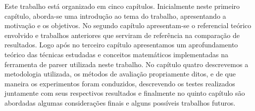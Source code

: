 Este trabalho está organizado em cinco capítulos. Inicialmente neste primeiro capítulo, aborda-se uma introdução ao tema do trabalho, apresentando a motivação e os objetivos. No segundo capítulo apresentam-se o referencial teórico envolvido e trabalhos anteriores que serviram de referência na comparação de resultados. Logo após no terceiro capítulo apresentamos um aprofundamento teórico das técnicas estudadas e conceitos matemáticos implementadas na ferramenta de parser utilizada neste trabalho. No capítulo quatro descrevemos a metodologia utilizada, os métodos de avaliação propriamente ditos, e de que maneira os experimentos foram conduzidos, descrevendo os testes realizados juntamente com seus respectivos resultados e finalmente no quinto capítulo são abordadas algumas considerações finais e alguns possíveis trabalhos futuros.
